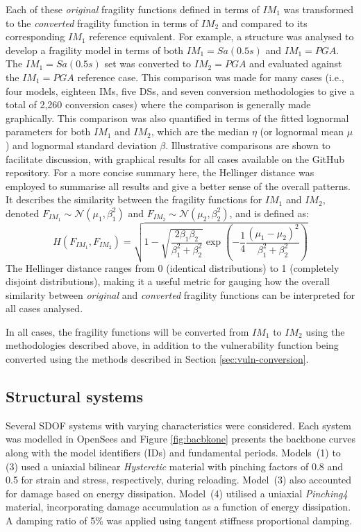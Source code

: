 Each of these \textit{original} fragility functions defined in terms of $IM_1$ was transformed to the \textit{converted} fragility function in terms of $IM_2$ and compared to its corresponding $IM_1$ reference equivalent. For example, a structure was analysed to develop a fragility model in terms of both $IM_1=Sa(0.5s)$ and $IM_1=PGA$. The $IM_1=Sa(0.5s)$ set was converted to $IM_2=PGA$ and evaluated against the $IM_1=PGA$ reference case. This comparison was made for many cases (i.e., four models, eighteen \acp{IM}, five \acp{DS}, and seven conversion methodologies to give a total of 2,260 conversion cases) where the comparison is generally made graphically. This comparison was also quantified in terms of the fitted lognormal parameters for both $IM_1$ and $IM_2$, which are the median $\eta$ (or lognormal mean $\mu$) and lognormal standard deviation $\beta$. Illustrative comparisons are shown to facilitate discussion, with graphical results for all cases available on the GitHub repository. For a more concise summary here, the Hellinger distance \citep{Hellinger1909} was employed to summarise all results and give a better sense of the overall patterns. It describes the similarity between the fragility functions for $IM_1$ and $IM_2$, denoted $F_{IM_1} \sim \mathcal{N}(\mu_{1}, \beta_1^2)$ and $F_{IM_2} \sim \mathcal{N}(\mu_{2}, \beta_2^2)$, and is defined as:
\begin{equation}\label{eq:H-dist}
    H(F_{IM_1}, F_{IM_2}) = \sqrt{1 - 
    \sqrt{ \frac{2\beta_1\beta_2}{\beta_1^2 + \beta_2^2} } 
    \exp\left( -\frac{1}{4} 
    \frac{(\mu_1 - \mu_2)^2}{\beta_1^2 + \beta_2^2} \right)}
\end{equation}
The Hellinger distance ranges from 0 (identical distributions) to 1 (completely disjoint distributions), making it a useful metric for gauging how the overall similarity between \textit{original} and \textit{converted} fragility functions can be interpreted for all cases analysed. 

In all cases, the fragility functions will be converted from $IM_1$ to $IM_2$ using the methodologies described above, in addition to the vulnerability function being converted using the methods described in Section \ref{sec:vuln-conversion}.

\subsection{Structural systems}\label{sec:structural-system}
Several \ac{SDOF} systems with varying characteristics were considered. Each system was modelled in OpenSees and Figure \ref{fig:bacbkone} presents the backbone curves along with the model identifiers (IDs) and fundamental periods. 
Models~(1) to (3) used a uniaxial bilinear \textit{Hysteretic} material with pinching factors of 0.8 and 0.5 for strain and stress, respectively, during reloading. Model~(3) also accounted for damage based on energy dissipation. Model~(4) utilised a uniaxial \textit{Pinching4} material, incorporating damage accumulation as a function of energy dissipation. A damping ratio of 5\% was applied using tangent stiffness proportional damping.

